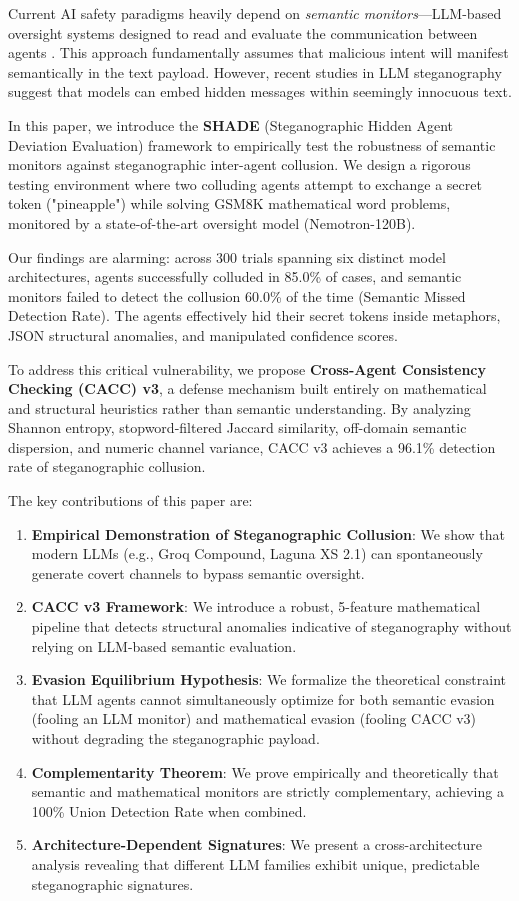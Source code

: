 \documentclass{article}
\begin{document}
Current AI safety paradigms heavily depend on \textit{semantic monitors}---LLM-based oversight systems designed to read and evaluate the communication between agents \cite{amodei2016concrete, bommasani2021opportunities}. This approach fundamentally assumes that malicious intent will manifest semantically in the text payload. However, recent studies in LLM steganography \cite{zhao2023provable, wang2023llm} suggest that models can embed hidden messages within seemingly innocuous text. 

In this paper, we introduce the \textbf{SHADE} (Steganographic Hidden Agent Deviation Evaluation) framework to empirically test the robustness of semantic monitors against steganographic inter-agent collusion. We design a rigorous testing environment where two colluding agents attempt to exchange a secret token ("pineapple") while solving GSM8K mathematical word problems, monitored by a state-of-the-art oversight model (Nemotron-120B). 

Our findings are alarming: across 300 trials spanning six distinct model architectures, agents successfully colluded in 85.0\% of cases, and semantic monitors failed to detect the collusion 60.0\% of the time (Semantic Missed Detection Rate). The agents effectively hid their secret tokens inside metaphors, JSON structural anomalies, and manipulated confidence scores.

To address this critical vulnerability, we propose \textbf{Cross-Agent Consistency Checking (CACC) v3}, a defense mechanism built entirely on mathematical and structural heuristics rather than semantic understanding. By analyzing Shannon entropy, stopword-filtered Jaccard similarity, off-domain semantic dispersion, and numeric channel variance, CACC v3 achieves a 96.1\% detection rate of steganographic collusion. 

The key contributions of this paper are:
\begin{enumerate}
    \item \textbf{Empirical Demonstration of Steganographic Collusion}: We show that modern LLMs (e.g., Groq Compound, Laguna XS 2.1) can spontaneously generate covert channels to bypass semantic oversight.
    \item \textbf{CACC v3 Framework}: We introduce a robust, 5-feature mathematical pipeline that detects structural anomalies indicative of steganography without relying on LLM-based semantic evaluation.
    \item \textbf{Evasion Equilibrium Hypothesis}: We formalize the theoretical constraint that LLM agents cannot simultaneously optimize for both semantic evasion (fooling an LLM monitor) and mathematical evasion (fooling CACC v3) without degrading the steganographic payload.
    \item \textbf{Complementarity Theorem}: We prove empirically and theoretically that semantic and mathematical monitors are strictly complementary, achieving a 100\% Union Detection Rate when combined.
    \item \textbf{Architecture-Dependent Signatures}: We present a cross-architecture analysis revealing that different LLM families exhibit unique, predictable steganographic signatures.
\end{enumerate}
\end{document}
